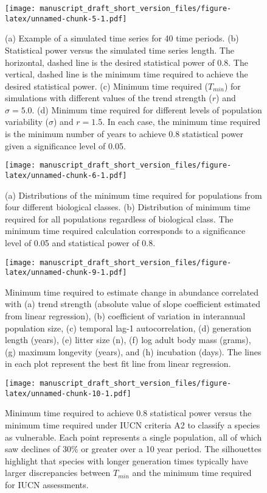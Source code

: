 \documentclass[12pt,]{article}
\begin{document}
\pagebreak

\begin{figure}
\centering
\texttt{[image: manuscript\_draft\_short\_version\_files/figure-latex/unnamed-chunk-5-1.pdf]}
\caption{(a) Example of a simulated time series for 40 time periods. (b)
Statistical power versus the simulated time series length. The
horizontal, dashed line is the desired statistical power of 0.8. The
vertical, dashed line is the minimum time required to achieve the
desired statistical power. (c) Minimum time required (\(T_{min}\)) for
simulations with different values of the trend strength (\(r\)) and
\(\sigma = 5.0\). (d) Minimum time required for different levels of
population variability (\(\sigma\)) and \(r=1.5\). In each case, the
minimum time required is the minimum number of years to achieve 0.8
statistical power given a significance level of
0.05.\label{fig:theoretical_approach}}
\end{figure}

\pagebreak

\begin{figure}
\centering
\texttt{[image: manuscript\_draft\_short\_version\_files/figure-latex/unnamed-chunk-6-1.pdf]}
\caption{(a) Distributions of the minimum time required for populations
from four different biological classes. (b) Distribution of minimum time
required for all populations regardless of biological class. The minimum
time required calculation corresponds to a significance level of 0.05
and statistical power of 0.8.\label{fig:min_time_dist}}
\end{figure}

\clearpage

\begin{figure}
\centering
\texttt{[image: manuscript\_draft\_short\_version\_files/figure-latex/unnamed-chunk-9-1.pdf]}
\caption{Minimum time required to estimate change in abundance
correlated with (a) trend strength (absolute value of slope coefficient
estimated from linear regression), (b) coefficient of variation in
interannual population size, (c) temporal lag-1 autocorrelation, (d)
generation length (years), (e) litter size (n), (f) log adult body mass
(grams), (g) maximum longevity (years), and (h) incubation (days). The
lines in each plot represent the best fit line from linear
regression.\label{fig:correlates}}
\end{figure}

\clearpage

\begin{figure}
\centering
\texttt{[image: manuscript\_draft\_short\_version\_files/figure-latex/unnamed-chunk-10-1.pdf]}
\caption{Minimum time required to achieve 0.8 statistical power versus
the minimum time required under IUCN criteria A2 to classify a species
as vulnerable. Each point represents a single population, all of which
saw declines of 30\% or greater over a 10 year period. The silhouettes
highlight that species with longer generation times typically have
larger discrepancies between \(T_{min}\) and the minimum time required
for IUCN assessments.\label{fig:IUCN_analysis}}
\end{figure}
\end{document}
